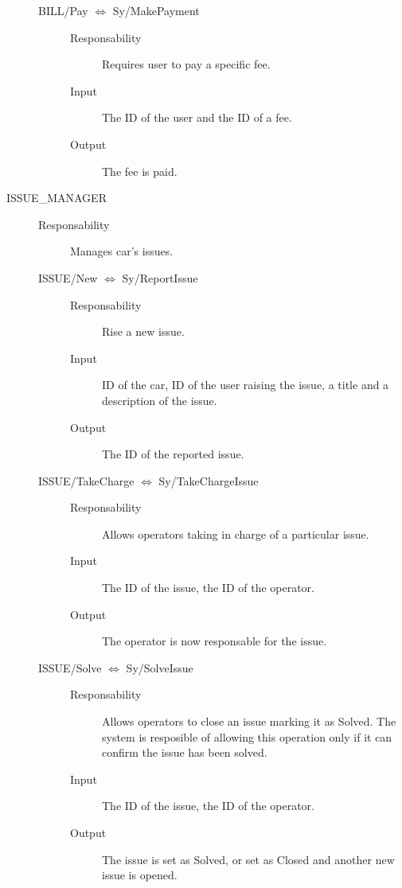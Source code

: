 \documentclass[11pt]{article} %
\begin{document}
\begin{description}
\begin{description}
	\item[BILL/Pay $\Leftrightarrow$ Sy/MakePayment] \hfill
		\begin{description}
			\item[Responsability] Requires user to pay a specific fee.
			\item[Input] The ID of the user and the ID of a fee.
			\item[Output] The fee is paid.
		\end{description}
	\end{description}

	\item[ISSUE\_MANAGER] \hfill
	\begin{description}
		\item[Responsability] Manages car's issues.

	\item[ISSUE/New $\Leftrightarrow$ Sy/ReportIssue] \hfill
		\begin{description}
			\item[Responsability] Rise a new issue.
			\item[Input] ID of the car, ID of the user raising the issue, a title and a description of the issue.
			\item[Output] The ID of the reported issue.
		\end{description}

	\item[ISSUE/TakeCharge $\Leftrightarrow$ Sy/TakeChargeIssue] \hfill
		\begin{description}
			\item[Responsability] Allows operators taking in charge of a particular issue.
			\item[Input] The ID of the issue, the ID of the operator.
			\item[Output] The operator is now responsable for the issue.
		\end{description}

	\item[ISSUE/Solve $\Leftrightarrow$ Sy/SolveIssue] \hfill
		\begin{description}
			\item[Responsability] Allows operators to close an issue marking it as Solved. The system is resposible of allowing this operation only if it can confirm the issue has been solved.
			\item[Input] The ID of the issue, the ID of the operator.
			\item[Output] The issue is set as Solved, or set as Closed and another new issue is opened.
		\end{description}


\end{description}
\end{description}
\end{document}
